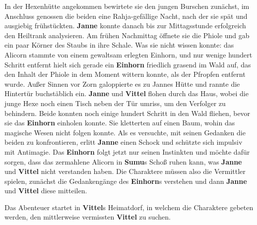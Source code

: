 In der Hexenhütte angekommen bewirtete sie den jungen Burschen zunächst, im Anschluss genossen die beiden eine Rahja-gefällige Nacht, nach der sie spät und 
ausgiebig frühstückten.
\textbf{Janne} konnte danach bis zur Mittagsstunde erfolgreich den Heiltrank analysieren.
Am frühen Nachmittag öffnete sie die Phiole und gab ein paar Körner des Staubs in ihre Schale. Was sie nicht wissen konnte:
das Alicorn stammte von einem gewaltsam erlegten Einhorn, und nur wenige hundert Schritt entfernt hielt sich gerade ein \textbf{Einhorn} friedlich grasend im Wald auf, das den Inhalt der Phiole in dem Moment wittern konnte, als der Pfropfen entfernt wurde.
Außer Sinnen vor Zorn galoppierte es zu Jannes Hütte und rannte die Hintertür buchstäblich ein.
\textbf{Janne} und \textbf{Vittel} flohen durch das Haus, wobei die junge Hexe noch einen Tisch neben der Tür umriss, um den Verfolger zu behindern.
Beide konnten noch einige hundert Schritt in den Wald fliehen, bevor sie das \textbf{Einhorn} einholen konnte.
Sie kletterten auf einen Baum, wohin das magische Wesen nicht folgen konnte.
Als es versuchte, mit seinen Gedanken die beiden zu konfrontieren, erlitt \textbf{Janne} einen Schock und schützte sich impulsiv mit Antimagie.
Das \textbf{Einhorn} folgt jetzt nur seinen Instinkten und möchte dafür sorgen, dass das zermahlene Alicorn in \textbf{Sumu}s Schoß ruhen kann, was \textbf{Janne} und \textbf{Vittel} nicht verstanden haben.
Die Charaktere müssen also die Vermittler spielen, zunächst die Gedankengänge des \textbf{Einhorn}s verstehen und dann \textbf{Janne} und \textbf{Vittel} diese mitteilen.

Das Abenteuer startet in \textbf{Vittel}s Heimatdorf, in welchem die Charaktere gebeten werden, den mittlerweise vermissten \textbf{Vittel} zu suchen. 



